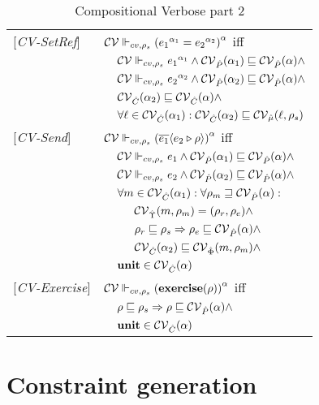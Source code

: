 \begin{table}[htb]
\begin{tabular} {l l l l}
{[\textit{CV-SetRef}]}&\multicolumn{3}{l}{$\mathcal{CV} \Vdash_{cv, \rho_s} {({e_1}^{\alpha_1} = {e_2}^{\alpha_2})}^{\alpha} $ iff}\\
&&\multicolumn{2}{l}{$ \mathcal{CV} \Vdash_{cv, \rho_s} {e_1}^{\alpha_1} \wedge \mathcal{CV}_{\hat{P}}(\alpha_1) \sqsubseteq \mathcal{CV}_{\hat{P}}(\alpha) \wedge $}\\
&&\multicolumn{2}{l}{$ \mathcal{CV} \Vdash_{cv, \rho_s} {e_2}^{\alpha_2} \wedge \mathcal{CV}_{\hat{P}}(\alpha_2) \sqsubseteq \mathcal{CV}_{\hat{P}}(\alpha) \wedge $}\\
&&\multicolumn{2}{l}{$\mathcal{CV}_{\hat{C}}(\alpha_2) \sqsubseteq \mathcal{CV}_{\hat{C}}(\alpha) \wedge$} \\
&&\multicolumn{2}{l}{$ \forall \ell \in \mathcal{CV}_{\hat{C}}(\alpha_1) : \mathcal{CV}_{\hat{C}}(\alpha_2) \sqsubseteq \mathcal{CV}_{\hat{\mu}}(\ell, \rho_s)$} \\
{[\textit{CV-Send}]}&\multicolumn{3}{l}{$\mathcal{CV} \Vdash_{cv, \rho_s} {(\overline{e_1} \langle e_2 \triangleright \rho \rangle)}^{\alpha} $ iff}\\
&&\multicolumn{2}{l}{$ \mathcal{CV} \Vdash_{cv, \rho_s} e_1 \wedge \mathcal{CV}_{\hat{P}}(\alpha_1) \sqsubseteq \mathcal{CV}_{\hat{P}}(\alpha) \wedge$}\\
&&\multicolumn{2}{l}{$ \mathcal{CV} \Vdash_{cv, \rho_s} e_2 \wedge \mathcal{CV}_{\hat{P}}(\alpha_2) \sqsubseteq \mathcal{CV}_{\hat{P}}(\alpha) \wedge$}\\
&&\multicolumn{2}{l}{$ \forall m \in \mathcal{CV}_{\hat{C}}(\alpha_1) : \forall \rho_m \sqsupseteq \mathcal{CV}_{\hat{P}}(\alpha):$}\\
&&&$\mathcal{CV}_{\hat{\Upsilon}}(m, \rho_m) = (\rho_r, \rho_e)\wedge $\\
&&&$\rho_r \sqsubseteq \rho_s \Rightarrow \rho_e \sqsubseteq \mathcal{CV}_{\hat{P}}(\alpha) \wedge$\\
&&&$\mathcal{CV}_{\hat{C}}(\alpha_2) \sqsubseteq \mathcal{CV}_{\hat{\Phi}}(m, \rho_m) \wedge $\\
&&\multicolumn{2}{l}{$\mathbf{unit} \in \mathcal{CV}_{\hat{C}}(\alpha) $}\\
{[\textit{CV-Exercise}]}&\multicolumn{3}{l}{$\mathcal{CV} \Vdash_{cv, \rho_s} {(\mathbf{exercise}(\rho))}^{\alpha} $ iff}\\
&&\multicolumn{2}{l}{$ \rho \sqsubseteq \rho_s \Rightarrow \rho \sqsubseteq \mathcal{CV}_{\hat{P}}(\alpha) \wedge $}\\
&&\multicolumn{2}{l}{$ \mathbf{unit} \in \mathcal{CV}_{\hat{C}}(\alpha)$}\\
\end{tabular}
\caption{Compositional Verbose part 2}
\label{tab:CompVerb2}
\end{table}

\section{Constraint generation}
\label{sec:ConstraintGen}
\newcommand{\genl}[1]{\mathcal{C}_{*\rho_s}\llbracket (#1)^\all \rrbracket}
\newcommand{\gen}[1]{\mathcal{C}_{*\rho_s}\llbracket (#1) \rrbracket}
\newcommand{\Cel}{\mathsf{C}}
\newcommand{\Rel}{\mathsf{\Gamma}}
\newcommand{\Pel}{\mathsf{P}}
\newcommand{\Mel}{\mathsf{M}}
\newcommand{\El}{\mathsf{E}}
\newcommand{\Upsel}{\mathsf{\Upsilon}}
\newcommand{\Phiel}{\mathsf{\Phi}}
\newcommand{\braces}[1]{\{ #1 \} }
\newcommand{\parens}[1]{\( #1 \) }

